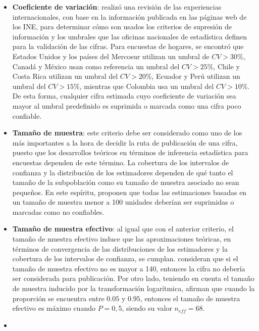 \documentclass[
  12pt,
]{book}
\providecommand{\tightlist}{%
  \setlength{\itemsep}{0pt}\setlength{\parskip}{0pt}}
\begin{document}
\begin{itemize}
\tightlist
\item
  \textbf{Coeficiente de variación}: \citet{CepalSAe2018} realizó una revisión de las experiencias internacionales, con base en la información publicada en las páginas web de los INE, para determinar cómo son usados los criterios de supresión de información y los umbrales que las oficinas nacionales de estadística definen para la validación de las cifras. Para encuestas de hogares, se encontró que Estados Unidos y los países del Mercosur utilizan un umbral de \(CV > 30\%\), Canadá y México usan como referencia un umbral del \(CV > 25\%\), Chile y Costa Rica utilizan un umbral del \(CV > 20\%\), Ecuador y Perú utilizan un umbral del \(CV > 15\%\), mientras que Colombia usa un umbral del \(CV > 10\%\). De esta forma, cualquier cifra estimada cuyo coeficiente de variación sea mayor al umbral predefinido es suprimida o marcada como una cifra poco confiable.
\item
  \textbf{Tamaño de muestra}: este criterio debe ser considerado como uno de los más importantes a la hora de decidir la ruta de publicación de una cifra, puesto que los desarrollos teóricos en términos de inferencia estadística para encuestas dependen de este término. La cobertura de los intervalos de confianza y la distribución de los estimadores dependen de qué tanto el tamaño de la subpoblación como su tamaño de muestra asociado no sean pequeños. En este espíritu, \citet{Barnett_Walker_Chromy_Davis_Emrich_Odom_Packer_2003} proponen que todas las estimaciones basadas en un tamaño de muestra menor a 100 unidades deberían ser suprimidas o marcadas como no confiables.
\item
  \textbf{Tamaño de muestra efectivo}: al igual que con el anterior criterio, el tamaño de muestra efectivo induce que las aproximaciones teóricas, en términos de convergencia de las distribuciones de los estimadores y la cobertura de los intervalos de confianza, se cumplan. \citet{Hornik_Maklan_Cadell_Prado_Barmada_Jacobsohn_Orwin_Sridharan_Zador_Southwell_etal} consideran que si el tamaño de muestra efectivo no es mayor a 140, entonces la cifra no debería ser considerada para publicación. Por otro lado, teniendo en cuenta el tamaño de muestra inducido por la transformación logarítmica, \citet{Barnett_Walker_Chromy_Davis_Emrich_Odom_Packer_2003} afirman que cuando la proporción se encuentra entre \(0.05\) y \(0.95\), entonces el tamaño de muestra efectivo es máximo cuando \(P = 0,5\), siendo su valor \(n_{eff} = 68\).
\item

\end{itemize}
\end{document}
